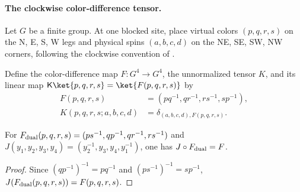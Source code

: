 \paragraph{The clockwise color-difference tensor.}
Let $G$ be a finite group. At one blocked site, place virtual colors $(p,q,r,s)$ on the N, E, S, W legs and physical spins $(a,b,c,d)$ on the NE, SE, SW, NW corners, following the clockwise convention of \cite[Equation~(7.10) and footnote]{Schuch2010PEPS}.

\begin{definition}
    \label{def:peps_quantum_double_k_tensor}
    \leanok
    Define the color-difference map $F:G^4\to G^4$, the unnormalized tensor $K$, and its linear map $\mathsf K\ket{p,q,r,s}=\ket{F(p,q,r,s)}$ by
    \begin{align}
        F(p,q,r,s)         & =(pq^{-1},qr^{-1},rs^{-1},sp^{-1}), \\
        K(p,q,r,s;a,b,c,d) & =\delta_{(a,b,c,d),F(p,q,r,s)}.
        \label{eq:peps_qd_k_tensor}
    \end{align}
\end{definition}
\begin{tenkzequation}
    \tenkzkernel
    \begin{tenkz}[rows={wire},cols=1,bonds=none]
    \end{tenkz}
\end{tenkzequation}

\begin{lemma}
    \label{thm:peps_quantum_double_k_orientation}
    \leanok
    For $F_{\rm dual}(p,q,r,s)=(ps^{-1},qp^{-1},qr^{-1},rs^{-1})$ and $J(y_1,y_2,y_3,y_4)=(y_2^{-1},y_3,y_4,y_1^{-1})$, one has $J\circ F_{\rm dual}=F$.
\end{lemma}
\begin{proof}\leanok
    Since $(qp^{-1})^{-1}=pq^{-1}$ and $(ps^{-1})^{-1}=sp^{-1}$, $J(F_{\rm dual}(p,q,r,s))=F(p,q,r,s)$.
\end{proof}

